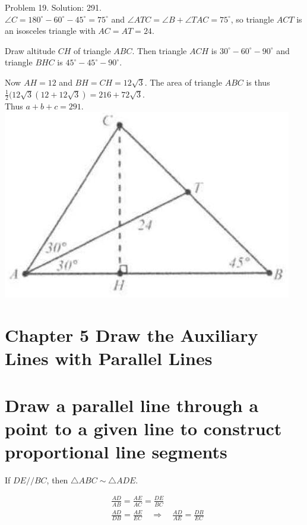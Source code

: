 \documentclass[10pt]{article}
\begin{document}
Problem 19. Solution: 291.\\
\(\angle C=180^{\circ}-60^{\circ}-45^{\circ}=75^{\circ}\) and \(\angle A T C=\angle B+\angle T A C=75^{\circ}\), so triangle \(A C T\) is an isosceles triangle with \(A C=A T=24\).

Draw altitude \(C H\) of triangle \(A B C\). Then triangle \(A C H\) is \(30^{\circ}-60^{\circ}-90^{\circ}\) and triangle \(B H C\) is \(45^{\circ}-45^{\circ}-90^{\circ}\).

Now \(A H=12\) and \(B H=C H=12 \sqrt{3}\). The area of triangle \(A B C\) is thus\\
\(\frac{1}{2}(12 \sqrt{3}(12+12 \sqrt{3})=216+72 \sqrt{3}\).\\
Thus \(a+b+c=291\).\\
\includegraphics[max width=\textwidth, center]{2025_04_17_97bc1f7e44d93c271a88g-100}

\section*{Chapter 5 Draw the Auxiliary Lines with Parallel Lines}
\section*{Draw a parallel line through a point to a given line to construct proportional line segments}
If \(D E / / B C\), then \(\triangle A B C \sim \triangle A D E\).

\[
\begin{aligned}
& \frac{A D}{A B}=\frac{A E}{A C}=\frac{D E}{B C} \\
& \frac{A D}{D B}=\frac{A E}{E C} \quad \Rightarrow \quad \frac{A D}{A E}=\frac{D B}{E C}
\end{aligned}
\]
\end{document}
